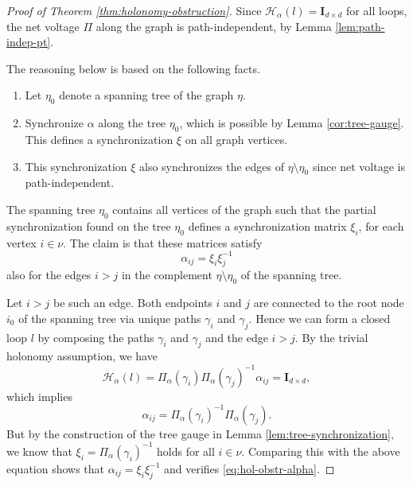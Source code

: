 \documentclass[10pt,reqno]{amsart}
\numberwithin{equation}{section}
\theoremstyle{bfnote}
\theoremstyle{bfdef}
\newcommand{\mc}[1]{\mathcal{#1}}
\newcommand{\II}{\mathbf{I}_{d \times d}}
\providecommand\gt; %
\renewcommand{\gt}{\xi}
\providecommand\a; %
\renewcommand{\a}{\alpha}
\providecommand\Hol; %
\renewcommand{\Hol}{\mc{H}}
\begin{document}
	\begin{proof}[Proof of Theorem \ref{thm:holonomy-obstruction}]
		Since $\Hol_{\a}(l)=\II$ for all loops, the net voltage $\Pi$ along the graph is path-independent, by Lemma \ref{lem:path-indep-pt}.

		The reasoning below is based on the following facts.
		\begin{enumerate}
			\item Let $\eta_0$ denote a spanning tree of the graph $\eta$.
			\item Synchronize $\a$ along the tree $\eta_0$, which is possible by Lemma \ref{cor:tree-gauge}. This defines a synchronization $\gt$ on all graph vertices.
			\item This synchronization $\gt$ also synchronizes the edges of $\eta \setminus \eta_0$ since net voltage is path-independent.
		\end{enumerate}
		The spanning tree $\eta_{0}$ contains all  vertices of the graph such that the partial synchronization found on the tree $\eta_{0}$ defines a synchronization matrix $\xi_{i}$, for each vertex $i \in \nu$.
		The claim is that these matrices satisfy
		\begin{equation}\label{eq:hol-obstr-alpha}
		\alpha_{ij} = \xi_{i} \xi_{j}^{-1}
		\end{equation}
		also for the edges $i > j$ in the complement $\eta\setminus \eta_{0}$ of the spanning tree.

		Let $i> j$ be such an edge. Both endpoints $i$ and $j$ are connected to the root node $i_{0}$ of the spanning tree via unique paths $\gamma_{i}$ and $\gamma_{j}$. Hence we can form a closed loop $l$ by composing the paths $\gamma_{i}$ and $\gamma_{j}$ and the edge $i > j$. By the trivial holonomy assumption, we have
		\begin{equation}
			\Hol_{\a}(l) = \Pi_{\a}(\gamma_{i})\Pi_{\a}(\gamma_{j})^{-1}\alpha_{ij}  = \II,
		\end{equation}
		which implies
		\begin{equation}
			\alpha_{ij} = \Pi_{\a}(\gamma_{i})^{-1} \Pi_{\a}(\gamma_{j}).
		\end{equation}
		But by the construction of the tree gauge in Lemma \ref{lem:tree-synchronization}, we know that $\xi_{i} = \Pi_{\a}(\gamma_{i})^{-1}$ holds for all $i \in \nu$. Comparing this with the above equation shows that $\a_{ij} = \xi_{i} \xi_{j}^{-1}$ and verifies \eqref{eq:hol-obstr-alpha}.
	\end{proof}
\end{document}
